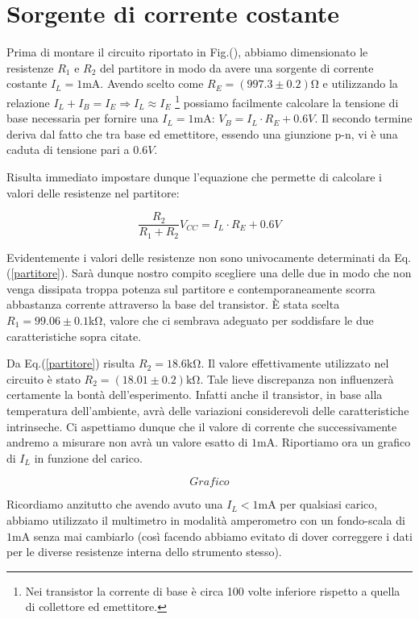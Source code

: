 \section{Sorgente di corrente costante}
Prima di montare il circuito riportato in Fig.(), abbiamo dimensionato le resistenze $R_1$ e $R_2$ del partitore in modo da avere una sorgente di corrente costante $I_L=1\si{\milli\ampere}$. Avendo scelto come $R_E=(997.3 \pm 0.2)\si{\ohm}$ e utilizzando la relazione $I_L+I_B=I_E \Rightarrow I_L \approx I_E$ \footnote{Nei transistor la corrente di base è circa 100 volte inferiore rispetto a quella di collettore ed emettitore.} possiamo facilmente calcolare la tensione di base necessaria per fornire una $I_L=1\si{\milli\ampere}$: $V_B=I_L \cdot R_E + 0.6V$. Il secondo termine deriva dal fatto che tra base ed emettitore, essendo una giunzione p-n, vi è una caduta di tensione pari a $0.6V$.

Risulta immediato impostare dunque l'equazione che permette di calcolare i valori delle resistenze nel partitore:

\begin{equation}
\frac{R_2}{R_1+R_2} V_{CC}=I_L \cdot R_E + 0.6V
\label{partitore}
\end{equation}

Evidentemente i valori delle resistenze non sono univocamente determinati da Eq.(\ref{partitore}). Sarà dunque nostro compito scegliere una delle due in modo che non venga dissipata troppa potenza sul partitore e contemporaneamente scorra abbastanza corrente attraverso la base del transistor. \`E stata scelta $R_1=99.06 \pm 0.1 \si{\kilo\ohm}$, valore che ci sembrava adeguato per soddisfare le due caratteristiche sopra citate. 

Da Eq.(\ref{partitore}) risulta $R_2 = 18.6\si{\kilo\ohm} $. Il valore effettivamente utilizzato nel circuito è stato $R_2 = (18.01 \pm 0.2 )\si{\kilo\ohm} $. Tale lieve discrepanza non influenzerà certamente la bontà dell'esperimento. Infatti anche il transistor, in base alla temperatura dell'ambiente, avrà delle variazioni considerevoli delle caratteristiche intrinseche. Ci aspettiamo dunque che il valore di corrente che successivamente andremo a misurare non avrà un valore esatto di $1\si{\milli\ampere}$. 
Riportiamo ora un grafico di $I_L$ in funzione del carico.

$$Grafico$$

Ricordiamo anzitutto che avendo avuto una $I_L<1\si{\milli\ampere}$ per qualsiasi carico, abbiamo utilizzato il multimetro in modalità amperometro con un fondo-scala di $1\si{\milli\ampere}$ senza mai cambiarlo (così facendo abbiamo evitato di dover correggere i dati per le diverse resistenze interna dello strumento stesso).

